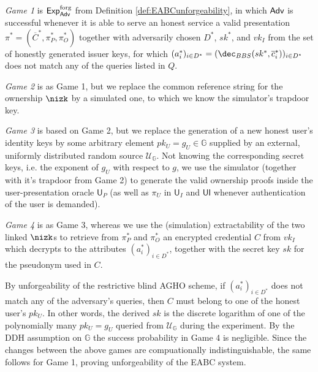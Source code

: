 \begin{description}
\item
\emph{Game 1}
is  $\operatorname{\mathsf{Exp}_{\mathsf{Adv}}^{forg}}$ from Definition \ref{def:EABCunforgeability}, 
in which $\mathsf{Adv}$ is successful whenever it is able to serve an honest service a valid presentation $\pi^*=(\overline C^*, \pi_P^*, \pi_O^*)$ together with adversarily chosen $D^*$, $sk^*$, and $vk_I$ from the set of honestly generated issuer keys, for which  $(a_i^*)_{i\in D^*}= (\dec_{BBS}(sk^*,\overline c_i^*))_{i\in D^*}$ does not match any of the queries listed in $Q$.

\item
\emph{Game 2}
is as Game 1, but we replace the common reference string for the ownership $\nizk$ by a simulated one, to which we know the simulator's trapdoor key.

\item
\emph{Game 3}
is based on Game 2, but we replace the generation of a new honest user's identity keys  by some arbitrary element $pk_U= g_U\in \mathbb G$  supplied by an external, uniformly distributed random source $\mathcal U_{\mathbb G}$.
Not knowing the corresponding secret keys, i.e. the exponent of $g_U$ with respect to $g$, we use the simulator (together with it's trapdoor from Game 2) to generate the valid ownership proofs inside the user-presentation oracle  $\mathsf{U}_P$ (as well as $\pi_U$ in  $\mathsf{U}_I$ and $\mathsf{UI}$ whenever authentication of the user is demanded). 

\item
\emph{Game 4}
is as Game 3, whereas we use the (simulation) extractability of the two linked $\nizk$s to retrieve from  $\pi_P^*$ and $\pi_O^*$ an encrypted credential $C$ from $vk_I$ which decrypts to the attributes $(a_i^*)_{i\in D^*}$,  together with the secret key $sk$ for the pseudonym used in $C$.
\end{description}

By unforgeability of the  restrictive blind AGHO scheme, if $(a_i^*)_{i\in D^*}$ does not match any of the adversary's queries, then $C$ must belong to one of the honest user's $pk_U$.
In other words, the derived $sk$ is the discrete logarithm of one of the polynomially many $pk_U=g_U$ queried from $\mathcal U_{\mathbb G}$ during the experiment.
By the DDH assumption on $\mathbb G$ the success probability in Game 4 is negligible.
Since the changes between the above games are compuationally indistinguishable, the same follows for Game 1, proving unforgeability of the EABC system.




